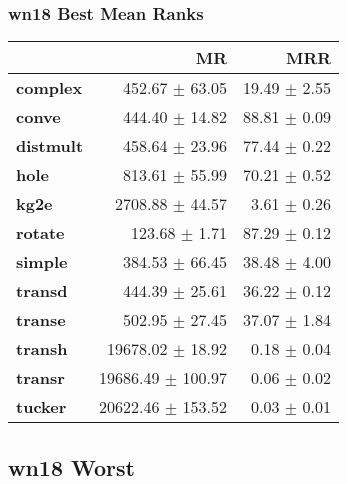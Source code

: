 \documentclass{article}
\begin{document}
\subsubsection{wn18 Best Mean Ranks}
    \begin{center}
    \begin{tabular}{lrr}
\toprule
{} &                 MR &           MRR \\
\midrule
\textbf{complex } &     452.67 $\pm$ 63.05 &  19.49 $\pm$ 2.55 \\
\textbf{conve   } &     444.40 $\pm$ 14.82 &  88.81 $\pm$ 0.09 \\
\textbf{distmult} &     458.64 $\pm$ 23.96 &  77.44 $\pm$ 0.22 \\
\textbf{hole    } &     813.61 $\pm$ 55.99 &  70.21 $\pm$ 0.52 \\
\textbf{kg2e    } &    2708.88 $\pm$ 44.57 &   3.61 $\pm$ 0.26 \\
\textbf{rotate  } &      123.68 $\pm$ 1.71 &  87.29 $\pm$ 0.12 \\
\textbf{simple  } &     384.53 $\pm$ 66.45 &  38.48 $\pm$ 4.00 \\
\textbf{transd  } &     444.39 $\pm$ 25.61 &  36.22 $\pm$ 0.12 \\
\textbf{transe  } &     502.95 $\pm$ 27.45 &  37.07 $\pm$ 1.84 \\
\textbf{transh  } &   19678.02 $\pm$ 18.92 &   0.18 $\pm$ 0.04 \\
\textbf{transr  } &  19686.49 $\pm$ 100.97 &   0.06 $\pm$ 0.02 \\
\textbf{tucker  } &  20622.46 $\pm$ 153.52 &   0.03 $\pm$ 0.01 \\
\bottomrule
\end{tabular}

    \end{center}
\subsection{wn18 Worst}
\end{document}
